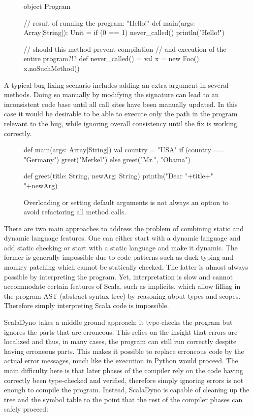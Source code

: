 \begin{figure}[h]
\begin{lstlisting-nobreak}
 object Program {
   // result of running the program: "Hello!"
   def main(args: Array[String]): Unit = {
     if (0 == 1)
       never_called()
     println("Hello!")
   }

   // should this method prevent compilation
   // and execution of the entire program?!?
   def never_called() = {
     val x = new Foo()
     x.noSuchMethod()
   }
 }
\end{lstlisting-nobreak}
\vspace{-8mm}
\end{figure}

A typical bug-fixing scenario includes adding an extra argument in several methods. Doing so manually by modifying the signature can lead to an inconsistent code base until all call sites have been manually updated. In this case it would be desirable to be able to execute only the path in the program relevant to the bug, while ignoring overall consistency until the fix is working correctly.

\begin{figure}[h]
\begin{lstlisting-nobreak}
def main(args: Array[String]) {
	val country = "USA"
	if (country == "Germany") {
		greet("Merkel")
	} else {
		greet("Mr.", "Obama")
	}
}

def greet(title: String, newArg: String) {
	println("Dear "+title+" "+newArg)
}
\end{lstlisting-nobreak}
\caption[default args]
   {Overloading or setting default arguments is not always an option to avoid refactoring all method calls.}
\end{figure}

There are two main approaches to address the problem of combining static and dynamic language features. One can either start with a dynamic language and add static checking or start with a static language and make it dynamic. The former is generally impossible due to code patterns such as duck typing and monkey patching which cannot be statically checked. The latter is almost always possible by interpreting the program. Yet, interpretation is slow and cannot accommodate certain features of Scala, such as implicits, which allow filling in the program AST (abstract syntax tree) by reasoning about types and scopes. Therefore simply interpreting Scala code is impossible.

ScalaDyno takes a middle ground approach: it type-checks the program but ignores the parts that are erroneous. This relies on the insight that errors are localized and thus, in many cases, the program can still run correctly despite having erroneous parts. This makes it possible to replace erroneous code by the actual error messages, much like the execution in Python would proceed. The main difficulty here is that later phases of the compiler rely on the code having correctly been type-checked and verified, therefore simply ignoring errors is not enough to compile the program. Instead, ScalaDyno is capable of cleaning up the tree and the symbol table to the point that the rest of the compiler phases can safely proceed:

